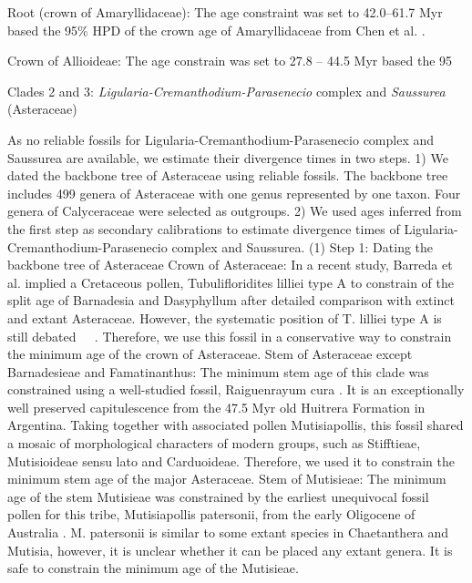 \documentclass[10pt]{article}
\begin{document}
Root (crown of Amaryllidaceae): The age constraint was set to
42.0--61.7 Myr based the 95\% HPD of the crown age of Amaryllidaceae
from Chen et al. \citep{Chen, Kim et al. 2013}.

Crown of Allioideae: The age constrain was set to 27.8 – 44.5 Myr based the 95%

Clades 2 and 3: \textit{Ligularia-Cremanthodium-Parasenecio} complex and
\textit{Saussurea} (Asteraceae)

As no reliable fossils for Ligularia-Cremanthodium-Parasenecio complex and Saussurea are available, we estimate their divergence times in two steps. 1) We dated the backbone tree of Asteraceae using reliable fossils. The backbone tree includes 499 genera of Asteraceae with one genus represented by one taxon. Four genera of Calyceraceae were selected as outgroups. 2) We used ages inferred from the first step as secondary calibrations to estimate divergence times of Ligularia-Cremanthodium-Parasenecio complex and Saussurea. 
(1) Step 1: Dating the backbone tree of Asteraceae
Crown of Asteraceae: In a recent study, Barreda et al. \citep{Barreda, Palazzesi et al. 2015} implied a Cretaceous pollen, Tubulifloridites lilliei type A to constrain of the split age of Barnadesia and Dasyphyllum after detailed comparison with extinct and extant Asteraceae. However, the systematic position of T. lilliei type A is still debated \citep{Barreda, Palazzesi et al. 2015, Panero 2015}. Therefore, we use this fossil in a conservative way to constrain the minimum age of the crown of Asteraceae. 
Stem of Asteraceae except Barnadesieae and Famatinanthus: The minimum stem age of this clade was constrained using a well-studied fossil, Raiguenrayum cura \citep{Barreda, Palazzesi et al. 2010, Barreda, Palazzesi et al. 2012}.  It is an exceptionally well preserved capitulescence from the 47.5 Myr old Huitrera Formation in Argentina. Taking together with associated pollen Mutisiapollis, this fossil shared a mosaic of morphological characters of modern groups, such as Stifftieae, Mutisioideae sensu lato and Carduoideae. Therefore, we used it to constrain the minimum stem age of the major Asteraceae.
Stem of Mutisieae: The minimum age of the stem Mutisieae was constrained by the earliest unequivocal fossil pollen for this tribe, Mutisiapollis patersonii, from the early Oligocene of Australia \citep{Macphail and Hill 1994}. M. patersonii is similar to some extant species in Chaetanthera and Mutisia, however, it is unclear whether it can be placed any extant genera. It is safe to constrain the minimum age of the Mutisieae. 
\end{document}
